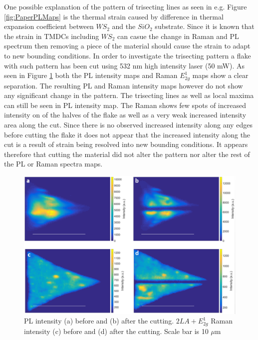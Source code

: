 One possible explanation of the pattern of trisecting lines as seen in e.g. Figure \ref{fig:PaperPLMaps} is the thermal strain caused by difference in thermal expansion coefficient between $WS_2$ and the $SiO_2$ substrate. Since it is known that the strain in TMDCs including $WS_2$ can casue the change in Raman and PL spectrum \cite{Liu2014}\cite{Hui2013} then removing a piece of the material should cause the strain to adapt to new bounding conditions. In order to investigate the trisecting pattern a flake with such pattern has been cut using 532 nm high intensity laser (50 mW). As seen in Figure \ref{fig:PaperSIMapsCutting} both the PL intensity maps and Raman $E^1_{2g}$ maps show a clear separation. The resulting PL and Raman intensity maps however do not show any significant change in the pattern. The trisecting lines as well as local maxima can still be seen in PL intensity map. The Raman shows few spots of increased intensity on of the halves of the flake as well as a very weak increased intensity area along the cut. Since there is no observed increased intensity along any edges before cutting the flake it does not appear that the increased intensity along the cut is a result of strain being resolved into new bounding conditions. It appears therefore that cutting the material did not alter the pattern nor alter the rest of the PL or Raman spectra maps.

\begin{figure}[h]
	\begin{center}
		\includegraphics[scale=0.3]{PaperSIMapsCutting.png}
		\caption{PL intensity (a) before and (b) after the cutting. $2LA+E^1_{2g}$ Raman intensity (c) before and (d) after the cutting. Scale bar is 10 $\mu$m}
		\label{fig:PaperSIMapsCutting}
	\end{center}
\end{figure}

